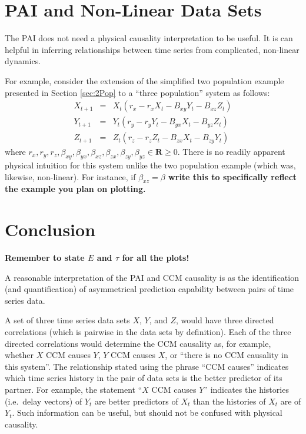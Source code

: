 \documentclass[a4paper,11pt]{article}
\begin{document}
\section{PAI and Non-Linear Data Sets}
The PAI does not need a physical causality interpretation to be useful.  It is can helpful in inferring relationships between time series from complicated, non-linear dynamics.  

For example, consider the extension of the simplified two population example presented in Section \ref{sec:2Pop} to a ``three population'' system as follows:
\begin{eqnarray}
X_{t+1} &=& X_t\left(r_x-r_x X_t-B_{xy} Y_t-B_{xz} Z_t\right)\\
Y_{t+1} &=& Y_t\left(r_y-r_y Y_t-B_{yx} X_t-B_{yz} Z_t\right)\\
Z_{t+1} &=& Z_t\left(r_z-r_z Z_t-B_{zx} X_t-B_{zy} Y_t\right)
\end{eqnarray}
where $r_x,r_y,r_z,\beta_{xy},\beta_{yx},\beta_{xz},\beta_{zx},\beta_{zy},\beta_{yz}\in\mathbf{R}\ge 0$.  There is no readily apparent physical intuition for this system unlike the two population example (which was, likewise, non-linear).  For instance, if $\beta_{xz}=\beta_{}$ {\bf write this to specifically reflect the example you plan on plotting.}

\section{Conclusion}
{\bf Remember to state $E$ and $\tau$ for all the plots!}

A reasonable interpretation of the PAI and CCM causality is as the identification (and quantification) of asymmetrical prediction capability between pairs of time series data.

A set of three time series data sets $X$, $Y$, and $Z$, would have three directed correlations (which is pairwise in the data sets by definition).  Each of the three directed correlations would determine the CCM causality as, for example, whether $X$ CCM causes $Y$, $Y$ CCM causes $X$, or ``there is no CCM causality in this system''.  The relationship stated using the phrase ``CCM causes'' indicates which time series history in the pair of data sets is the better predictor of its partner.  For example, the statement ``$X$ CCM causes $Y$'' indicates the histories (i.e.\ delay vectors) of $Y_t$ are better predictors of $X_t$ than the histories of $X_t$ are of $Y_t$.  Such information can be useful, but should not be confused with physical causality.
\end{document}
